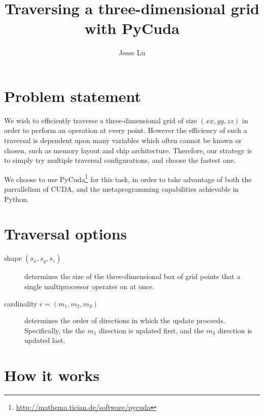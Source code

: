 \documentclass{article}
\title{Traversing a three-dimensional grid with PyCuda}
\author{Jesse Lu}
\begin{document}
\maketitle


\section{Problem statement}
We wish to efficiently traverse a three-dimensional grid of size $(xx,yy,zz)$
    in order to perform an operation at every point.
However the efficiency of such a traversal is dependent upon many variables
    which often cannot be known or chosen,
    such as memory layout and chip architecture.
Therefore, our strategy is to simply try multiple traversal configurations,
    and choose the fastest one.

We choose to use PyCuda\footnote{\url{http://mathema.tician.de/software/pycuda}}
    for this task, in order to take advantage of both the parrallelism of CUDA,
    and the metaprogramming capabilities achievable in Python.


\section{Traversal options}
\begin{description}
\item[shape $(s_x, s_y, s_z)$] determines the size of the three-dimensional box
    of grid points that a single multiprocessor operates on at once.
\item[cardinality $c = (m_1, m_2, m_3)$] determines the order of directions 
    in which the update proceeds. 
    Specifically, the the $m_1$ direction is updated first,
        and the $m_3$ direction is updated last.
\end{description}


\section{How it works}
\end{document}

